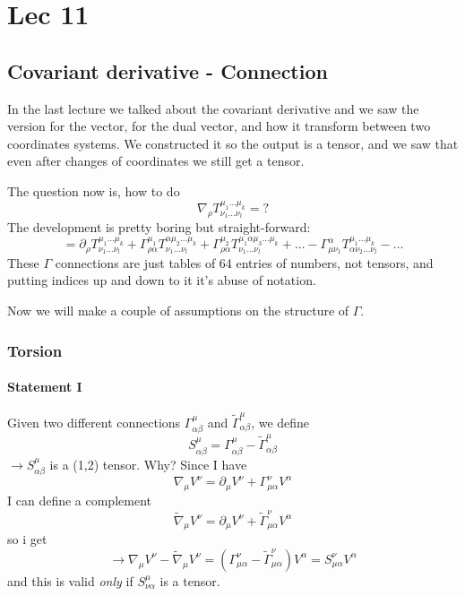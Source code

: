 \section{Lec 11}
\subsection{Covariant derivative - Connection}
In the last lecture we talked about the covariant derivative and we saw the version for the vector, for the dual vector, and how it transform between two coordinates systems. We constructed it so the output is a tensor, and we saw that even after changes of coordinates we still get a tensor.\par
The question now is, how to do
\[
\nabla _{\rho }T^{\mu _{1}\ldots \mu _{k}}_{\nu _{1}\ldots \nu _{l}} = ?
\]
The development is pretty boring but straight-forward:
\begin{equation}
= \partial_{\rho }T^{\mu_{1} \ldots \mu_{k}}_{\nu_{1} \ldots \nu_{l}} + \Gamma ^{\mu _{1}}_{\rho \alpha } T^{\alpha \mu_{2} \ldots \mu_{k}}_{\nu_{1} \ldots \nu_{l}} + \Gamma ^{\mu_{2}}_{\rho \alpha }T^{\mu_{1} \alpha \mu_{3} \ldots \mu_{k}}_{\nu_{1} \ldots \nu_{l}} + \ldots - \Gamma ^{\alpha }_{\mu \nu _{1}} T^{\mu _{1} \ldots \mu _{k}}_{\alpha \nu_{2} \ldots \nu_{l}} - \ldots 
\end{equation}
These $\Gamma $ connections are just tables of 64 entries of numbers, not tensors, and putting indices up and down to it it's abuse of notation. \par
Now we will make a couple of assumptions on the structure of $\Gamma $.
\subsubsection{Torsion}
\paragraph{Statement I} Given two different connections $\Gamma^{\mu }_{\alpha \beta }$ and $\tilde{\Gamma }^{\mu }_{\alpha \beta }$, we define
\[
S^{\mu }_{\alpha \beta } = \Gamma ^{\mu }_{\alpha \beta } - \tilde{\Gamma }^{\mu }_{\alpha \beta }	
\]
$\to  S^{\mu }_{\alpha \beta }$ is a (1,2) tensor. Why? Since I have
\[
\nabla _{\mu }V^{\nu } = \partial_{\mu }V^{\nu }+ \Gamma ^{\nu }_{\mu  \alpha }V^{\alpha }
\]
I can define a complement
\[
\tilde{\nabla }_{\mu }V^{\nu } = \partial_{\mu }V^{\nu } + \tilde{\Gamma }^{\nu }_{\mu \alpha }V^{\alpha }
\]
so i get
\[
\to  \nabla _{\mu }V^{\nu }- \tilde{\nabla }_{\mu }V^{\nu } = \left( \Gamma ^{\nu }_{\mu  \alpha } - \tilde{\Gamma }^{\nu }_{\mu  \alpha } \right)V^{\alpha } = S^{\nu }_{\mu  \alpha }V^{\alpha }
\]
and this is valid \emph{only} if $S^{\mu }_{\nu  \alpha }$ is a tensor.

